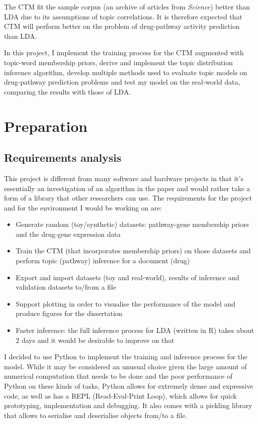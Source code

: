 \documentclass[12pt,a4paper,twoside,openright]{report}
\begin{document}
The CTM fit the sample corpus (an archive of articles from \textit{Science}) better than LDA due to its assumptions of topic correlations. It is therefore expected that CTM will perform better on the problem of drug-pathway activity prediction than LDA.

In this project, I implement the training process for the CTM augmented with topic-word membership priors, derive and implement the topic distribution inference algorithm, develop multiple methods used to evaluate topic models on drug-pathway prediction problems and test my model on the real-world data, comparing the results with those of LDA.

\chapter{Preparation}

\section{Requirements analysis}

This project is different from many software and hardware projects in that it's essentially an investigation of an algorithm in the paper and would rather take a form of a library that other researchers can use. The requirements for the project and for the environment I would be working on are:

\begin{itemize}[noitemsep]
\item Generate random (toy/synthetic) datasets: pathway-gene membership priors and the drug-gene expression data
\item Train the CTM (that incorporates membership priors) on those datasets and perform topic (pathway) inference for a document (drug)
\item Export and import datasets (toy and real-world), results of inference and validation datasets to/from a file
\item Support plotting in order to visualise the performance of the model and produce figures for the dissertation
\item Faster inference: the full inference process for LDA (written in R) takes about 2 days and it would be desirable to improve on that
\end{itemize}

I decided to use Python to implement the training and inference process for the model. While it may be considered an unusual choice given the large amount of numerical computation that needs to be done and the poor performance of Python on these kinds of tasks, Python allows for extremely dense and expressive code, as well as has a REPL (Read-Eval-Print Loop), which allows for quick prototyping, implementation and debugging. It also comes with a pickling library that allows to serialise and deserialise objects from/to a file. 
\end{document}
